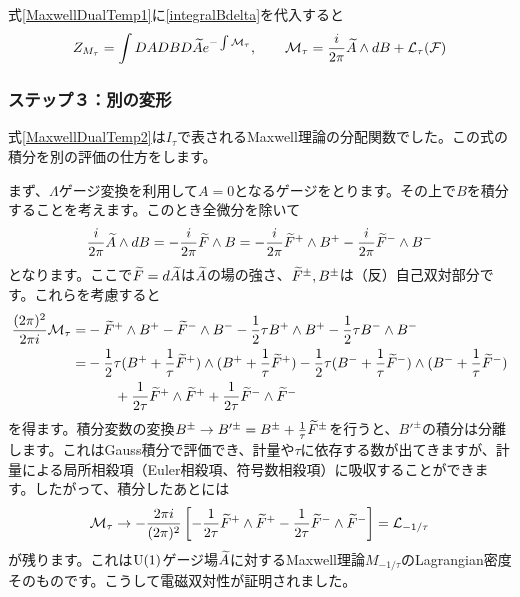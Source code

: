 \documentclass[generalized_symmetry.tex]{subfiles}
\begin{document}
式\eqref{MaxwellDualTemp1}に\eqref{integralBdelta}を代入すると
\begin{align}
  Z_{M_{\tau}}= \int DA DB D\widetilde{A} e^{-\int \mathcal{M}_{\tau}},\qquad \mathcal{M}_{\tau}=\frac{i}{2\pi}\widetilde{A} \wedge dB+\mathcal{L}_{\tau}(\mathcal{F})\label{MaxwellDualTemp2}
\end{align}

\subsubsection{ステップ３：別の変形}
式\eqref{MaxwellDualTemp2}は$I_{\tau}$で表されるMaxwell理論の分配関数でした。この式の積分を別の評価の仕方をします。

まず、$\Lambda$ゲージ変換を利用して$A=0$となるゲージをとります。その上で$B$を積分することを考えます。このとき全微分を除いて
\begin{align}
  \frac{i}{2\pi}\widetilde{A} \wedge dB=
  -\frac{i}{2\pi}\widetilde{F} \wedge B=
  -\frac{i}{2\pi}\widetilde{F}^{+} \wedge B^{+} -\frac{i}{2\pi}\widetilde{F}^{-} \wedge B^{-}
\end{align}
となります。ここで$\widetilde{F}=d\widetilde{A}$は$\widetilde{A}$の場の強さ、$\widetilde{F}^{\pm},B^{\pm}$は（反）自己双対部分です。これらを考慮すると
\begin{align}
  \frac{(2\pi)^2}{2\pi i}\mathcal{M}_{\tau}=&
  -\widetilde{F}^{+}\wedge B^{+}
  -\widetilde{F}^{-}\wedge B^{-}
  -\frac12 \tau B^{+}\wedge B^{+}
  -\frac12 \tau B^{-}\wedge B^{-}\notag\\
  =&
  -\frac12 \tau 
  (B^{+}+\frac{1}{\tau}\widetilde{F}^{+})\wedge
  (B^{+}+\frac{1}{\tau}\widetilde{F}^{+})
  -\frac12 \tau 
  (B^{-}+\frac{1}{\tau}\widetilde{F}^{-})\wedge
  (B^{-}+\frac{1}{\tau}\widetilde{F}^{-})\notag\\
  &\qquad+\frac{1}{2\tau}\widetilde{F}^{+}\wedge\widetilde{F}^{+}
  +\frac{1}{2\tau}\widetilde{F}^{-}\wedge\widetilde{F}^{-}
\end{align}
を得ます。積分変数の変換$B^{\pm}\to B'^{\pm}=B^{\pm}+\frac{1}{\tau}\widetilde{F}^{\pm}$を行うと、$B'^{\pm}$の積分は分離します。これはGauss積分で評価でき、計量や$\tau$に依存する数が出てきますが、計量による局所相殺項（Euler相殺項、符号数相殺項）に吸収することができます。したがって、積分したあとには
\begin{align}
  \mathcal{M}_{\tau}\to -\frac{2\pi i}{(2\pi)^2}\left[
  -\frac{1}{2\tau}\widetilde{F}^{+}\wedge\widetilde{F}^{+}
  -\frac{1}{2\tau}\widetilde{F}^{-}\wedge\widetilde{F}^{-}
  \right]=\mathcal{L}_{-1/\tau}
\end{align}
が残ります。これは$\mbox{U}(1)$ゲージ場$\widetilde{A}$に対するMaxwell理論$M_{-1/\tau}$のLagrangian密度そのものです。こうして電磁双対性が証明されました。
\end{document}

